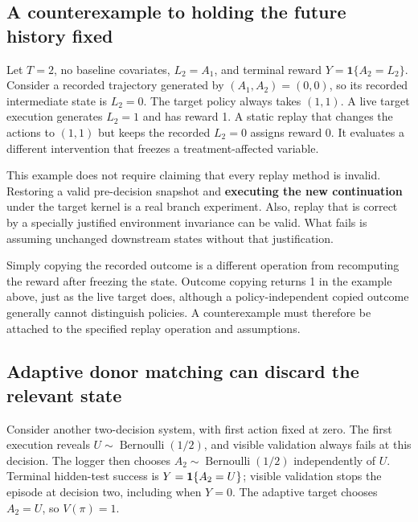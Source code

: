 \subsection{A counterexample to holding the future history fixed}\label{a-counterexample-to-holding-the-future-history-fixed}

Let \(T=2\), no baseline covariates, \(L_2=A_1\), and terminal reward \(Y=\mathbf{1}\{A_2=L_2\}\). Consider a recorded trajectory generated by \((A_1,A_2)=(0,0)\), so its recorded intermediate state is \(L_2=0\). The target policy always takes \((1,1)\). A live target execution generates \(L_2=1\) and has reward 1. A static replay that changes the actions to \((1,1)\) but keeps the recorded \(L_2=0\) assigns reward 0. It evaluates a different intervention that freezes a treatment-affected variable.

This example does not require claiming that every replay method is invalid. Restoring a valid pre-decision snapshot and \textbf{executing the new continuation} under the target kernel is a real branch experiment. Also, replay that is correct by a specially justified environment invariance can be valid. What fails is assuming unchanged downstream states without that justification.

Simply copying the recorded outcome is a different operation from recomputing the reward after freezing the state. Outcome copying returns 1 in the example above, just as the live target does, although a policy-independent copied outcome generally cannot distinguish policies. A counterexample must therefore be attached to the specified replay operation and assumptions.

\subsection{Adaptive donor matching can discard the relevant state}\label{adaptive-donor-replay}

Consider another two-decision system, with first action fixed at zero. The first execution reveals \(U\sim\operatorname{Bernoulli}(1/2)\), and visible validation always fails at this decision. The logger then chooses \(A_2\sim\operatorname{Bernoulli}(1/2)\) independently of \(U\). Terminal hidden-test success is \(Y=\mathbf{1}\{A_2=U\}\); visible validation stops the episode at decision two, including when \(Y=0\). The adaptive target chooses \(A_2=U\), so \(V(\pi)=1\).

